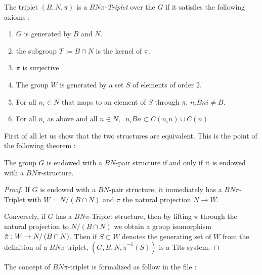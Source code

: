 \begin{definition}[$BN\pi$-Triplet] \label{BNpi}
  The triplet $\left( B,N, \pi \right)$ is a \emph{$BN\pi$-Triplet} over the $G$ if it satisfies the following axioms :
    \begin{enumerate}
        \item $G$ is generated by $B$ and $N$.
        \item the subgroup $T := B \cap N$ is the kernel of $\pi$.
        \item $\pi$ is surjective
        \item The group $W$ is generated by a set $S$ of elements of order 2.
        \item For all $n_{i} \in N$ that maps to an element of $S$ through $\pi$, $n_{i}Bni \neq B$.
        \item For all $n_{i}$ as above and all $n \in N, \ $ $n_i B n \subset C(n_in) \cup C(n)$
    \end{enumerate}
\end{definition}


First of all let us show that the two structures are equivalent. This is the point of the following theorem :

\begin{theoreme} \label{thm:to pi or not to pi}
    The group $G$ is endowed with a $BN$-pair structure if and only if it is endowed with a $BN\pi$-structure.
\end{theoreme}

\begin{proof}
    If $G$ is endowed with a $BN$-pair structure, it immediately has a $BN\pi$-Triplet with $W = N / (B \cap N)$ and $\pi$ the natural projection $N \to W$.

    Conversely, if $G$ has a $BN\pi$-Triplet structure, then by lifting $\pi$ through the natural projection to $N / \left( B \cap N \right)$ we obtain a group isomorphism $\tilde{\pi} : W \to N / \left( B \cap N \right)$. Then if $S \subset W$ denotes the generating set of $W$ from the definition of a $BN\pi$-triplet, $\left(G, B, N, \tilde{\pi}^{-1}\left( S \right)  \right)$ is a Tits system.
\end{proof}

The concept of $BN\pi$-triplet is formalized as follow in the  file :

